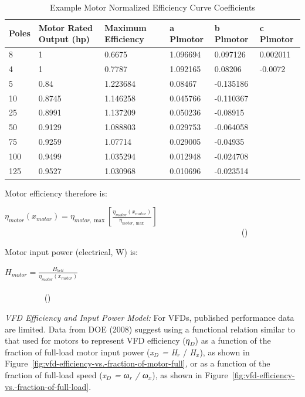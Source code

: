 \begin{longtable}[c]{p{1.0in}p{1.0in}p{1.0in}p{1.0in}p{1.0in}p{1.0in}}
\caption{Example Motor Normalized Efficiency Curve Coefficients \protect \label{table:example-motor-normalized-efficiency-curve}}\\
\toprule 
Poles & Motor Rated Output (hp) & Maximum Efficiency & a Plmotor & b Plmotor & c Plmotor \tabularnewline \midrule
\endhead
8 & 1 & 0.6675 & 1.096694 & 0.097126 & 0.002011 \tabularnewline
4 & 1 & 0.7787 & 1.092165 & 0.08206 & -0.0072 \tabularnewline
5 & 0.84 & 1.223684 & 0.08467 & -0.135186 \tabularnewline
10 & 0.8745 & 1.146258 & 0.045766 & -0.110367 \tabularnewline
25 & 0.8991 & 1.137209 & 0.050236 & -0.08915 \tabularnewline
50 & 0.9129 & 1.088803 & 0.029753 & -0.064058 \tabularnewline
75 & 0.9259 & 1.07714 & 0.029005 & -0.04935 \tabularnewline
100 & 0.9499 & 1.035294 & 0.012948 & -0.024708 \tabularnewline
125 & 0.9527 & 1.030968 & 0.010696 & -0.023514 \tabularnewline
\bottomrule
\end{longtable}

Motor efficiency therefore is:

\({\eta_{motor}}({x_{motor}}) = {\eta_{motor,\max }}\left[ {\frac{{{\eta_{motor}}({x_{motor}})}}{{{\eta_{motor,\max }}}}} \right]\) ~~~~~~~~~~~~~~~~~~~~~~~~~~~~~~~~~~~~~~~~~~~~~~~~~~~~~~~~~ ()

Motor input power (electrical, W) is:

\({H_{motor}} = \frac{{{H_{belt}}}}{{{\eta_{motor}}({x_{motor}})}}\) ~~~~~~~~~~~~~~~~~~~~~~~~~~~~~~~~~~~~~~~~~~~~~~~~~~~~~~~~~~~~~~~~~~~~~~~~~~~~~~~~~ ()

\emph{VFD Efficiency and Input Power Model:} For VFDs, published performance data are limited. Data from DOE (2008) suggest using a functional relation similar to that used for motors to represent VFD efficiency (\emph{η\(_{D}\)}) as a function of the fraction of full-load motor input power (\emph{x\(_{D}\) = H\(_{r}\)} / \emph{H\(_{x}\)}), as shown in Figure~\ref{fig:vfd-efficiency-vs.-fraction-of-motor-full}, or as a function of the fraction of full-load speed (\emph{x\(_{D}\) = ω\(_{r}\) / ω\(_{x}\)}), as shown in Figure~\ref{fig:vfd-efficiency-vs.-fraction-of-full-load}.


